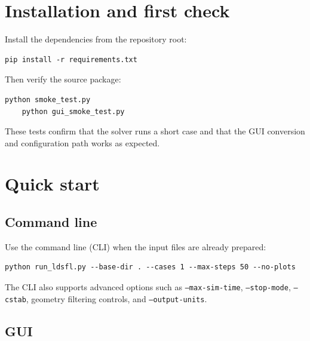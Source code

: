 \documentclass[11pt,a4paper]{article}
\begin{document}
\section{Installation and first check}
\label{Installation}

Install the dependencies from the repository root:
\vspace{0.5em}

\begin{lstlisting}[style=codeblock]
	pip install -r requirements.txt
\end{lstlisting}

Then verify the source package:
\vspace{0.5em}

\begin{lstlisting}[style=codeblock]
	python smoke_test.py
	python gui_smoke_test.py
\end{lstlisting}

These tests confirm that the solver runs a short case and that the GUI conversion and configuration path works as expected.

\section{Quick start}
\label{QuickStart}

\subsection{Command line}
\label{CommandLine}

Use the command line (CLI) when the input files are already prepared:
\vspace{0.5em}

\begin{lstlisting}[style=codeblock]
	python run_ldsfl.py --base-dir . --cases 1 --max-steps 50 --no-plots
\end{lstlisting}

\vspace{0.5em}
The CLI also supports advanced options such as \texttt{--max-sim-time}, \texttt{--stop-mode}, \texttt{--cstab}, geometry filtering controls, and \texttt{--output-units}.

\subsection{GUI}
\label{GUI}
\end{document}
